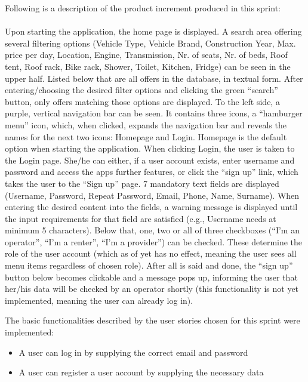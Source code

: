 Following is a description of the product increment produced in this sprint: \\ \\
Upon starting the application, the home page is displayed. A search area offering several filtering options (Vehicle Type, Vehicle Brand, Construction Year, Max. price per day, Location, Engine, Transmission, Nr. of seats, Nr. of beds, Roof tent, Roof rack, Bike rack, Shower, Toilet, Kitchen, Fridge) can be seen in the upper half. Listed below that are all offers in the database, in textual form. After entering/choosing the desired filter options and clicking the green “search” button, only offers matching those options are displayed.
To the left side, a purple, vertical navigation bar can be seen. It contains three icons, a “hamburger menu” icon, which, when clicked, expands the navigation bar and reveals the names for the next two icons: Homepage and Login. Homepage is the default option when starting the application. When clicking Login, the user is taken to the Login page. She/he can either, if a user account exists, enter username and password and access the apps further features, or click the “sign up” link, which takes the user to the “Sign up” page. 7 mandatory text fields are displayed (Username, Password, Repeat Password, Email, Phone, Name, Surname). When entering the desired content into the fields, a warning message is displayed until the input requirements for that field are satisfied (e.g., Username needs at minimum 5 characters). Below that, one, two or all of three checkboxes (“I’m an operator”, “I’m a renter”, “I’m a provider”) can be checked. These determine the role of the user account (which as of yet has no effect, meaning the user sees all menu items regardless of chosen role). After all is said and done, the “sign up” button below becomes clickable and a message pops up, informing the user that her/his data will be checked by an operator shortly (this functionality is not yet implemented, meaning the user can already log in).

The basic functionalities described by the user stories chosen for this sprint were implemented:

\begin{itemize}
    \item A user can log in by supplying the correct email and password
    \item A user can register a user account by supplying the necessary data
\end{itemize}


